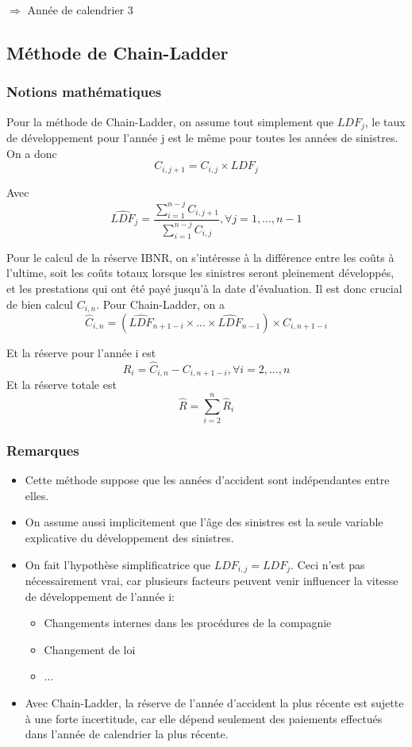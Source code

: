 $\Rightarrow$ \color{red} Année de calendrier 3 \color{black}

\subsection*{Méthode de Chain-Ladder}

\subsubsection*{Notions mathématiques}

Pour la méthode de Chain-Ladder, on assume tout simplement que $LDF_j$, le taux de développement pour l'année j est le même pour toutes les années de sinistres. On a donc
$$C_{i,j+1} = C_{i,j} \times LDF_j$$

Avec
$$\widehat{LDF}_j = \frac{\sum_{i=1}^{n-j} C_{i,j+1}}{\sum_{i=1}^{n-j} C_{i,j}}, \forall j=1,...,n-1$$

Pour le calcul de la réserve IBNR, on s'intéresse à la différence entre les coûts à l'ultime, soit les coûts totaux lorsque les sinistres seront pleinement développés, et les prestations qui ont été payé jusqu'à la date d'évaluation. Il est donc crucial de bien calcul $C_{i,n}$. Pour Chain-Ladder, on a
$$\widehat{C}_{i,n} = (\widehat{LDF}_{n+1-i}\times...\times\widehat{LDF}_{n-1})\times C_{i,n+1-i}$$

Et la réserve pour l'année i est
$$\widehat{R}_i=\widehat{C}_{i,n}-C_{i,n+1-i},\forall i=2,...,n$$
Et la réserve totale est
$$\widehat{R}=\sum_{i=2}^{n} \widehat{R}_i$$

\subsubsection*{Remarques}

\begin{itemize}
\item Cette méthode suppose que les années d'accident sont indépendantes entre elles.
\item On assume aussi implicitement que l'âge des sinistres est la seule variable explicative du développement des sinistres.
\item On fait l'hypothèse simplificatrice que $LDF_{i,j}=LDF_j$. Ceci n'est pas nécessairement vrai, car plusieurs facteurs peuvent venir influencer la vitesse de développement de l'année i:
	\begin{itemize}
	\item Changements internes dans les procédures de la compagnie
	\item Changement de loi
	\item ...
	\end{itemize}
\item Avec Chain-Ladder, la réserve de l'année d'accident la plus récente est sujette à une forte incertitude, car elle dépend seulement des paiements effectués dans l'année de calendrier la plus récente.
\end{itemize}


